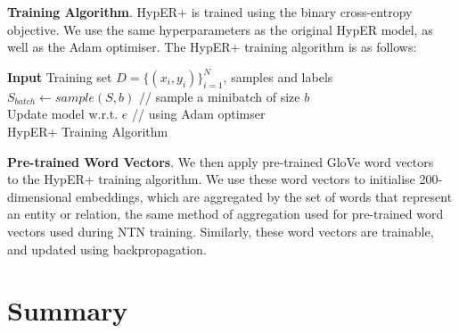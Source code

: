 \textbf{Training Algorithm}. HypER+ is trained using the binary cross-entropy objective. We use the same hyperparameters as the original HypER model, as well as the Adam optimiser. The HypER+ training algorithm is as follows: \newline

\begin{algorithm}[H]
	\SetAlgoLined
	\textbf{Input} 
	Training set \begin{math} D = \{(x_i, y_i)\}_{i=1}^N \end{math}, samples and labels\;
  	\begin{math} S_{batch} \gets sample(S, b) \end{math} // sample a minibatch of size \begin{math} b \end{math} \\
	Update model w.r.t. \begin{math}  e \end{math} // using Adam optimser \\
	\caption{HypER+ Training Algorithm}
\end{algorithm} \bigskip
 \bigskip
 
\textbf{Pre-trained Word Vectors}. We then apply pre-trained GloVe word vectors ~\citep{pennington2014glove} to the HypER+ training algorithm. We use these word vectors to initialise  200-dimensional embeddings, which are aggregated by the set of words that represent an entity or relation, the same method of aggregation used for pre-trained word vectors used during NTN training. Similarly, these word vectors are trainable, and updated using backpropagation.  



\section{Summary}

